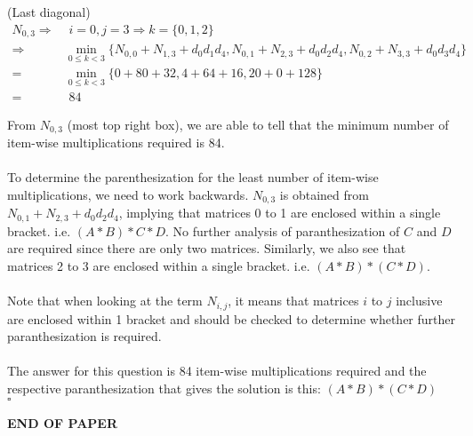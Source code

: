 \documentclass[12pt]{article}
\newcommand{\EOQ}{\hfill $\square$}
\begin{document}
\noindent (Last diagonal)
\begin{equation*}
\begin{split}
N_{0,3}\Rightarrow &\text{~}i=0, j=3 \Rightarrow k=\{0,1,2\} \\\Rightarrow &\min_{0\leq k<3}\{N_{0,0}+N_{1,3}+d_0d_1d_4,N_{0,1}+N_{2,3}+d_0d_2d_4,N_{0,2}+N_{3,3}+d_0d_3d_4\}\\
=&\min_{0\leq k<3}\{0+80+32,4+64+16,20+0+128\}\\
=&\text{~}84
\end{split}
\end{equation*}
\begin{figure}[H]
\centering
{}
\end{figure}
\noindent From $N_{0,3}$ (most top right box), we are able to tell that the minimum number of item-wise multiplications required is 84.\\\\To determine the parenthesization for the least number of item-wise multiplications, we need to work backwards.
$N_{0,3}$ is obtained from $N_{0,1}+N_{2,3}+d_0d_2d_4$, implying that matrices 0 to 1 are enclosed within a single bracket. i.e. $(A\ast B)\ast C \ast D$. No further analysis of paranthesization of $C$ and $D$ are required since there are only two matrices. Similarly, we also see that matrices 2 to 3 are enclosed within a single bracket. i.e. $(A\ast B)\ast (C \ast D)$.\\\\Note that when looking at the term $N_{i,j}$, it means that matrices $i$ to $j$ inclusive are enclosed within 1 bracket and should be checked to determine whether further paranthesization is required.\\\\
The answer for this question is 84 item-wise multiplications required and the respective paranthesization that gives the solution is this: $(A\ast B)\ast (C \ast D)$\\\mbox{}\EOQ
\bigskip
\vfill
\begin{center}{\bf END OF PAPER}\end{center}
\end{document}
